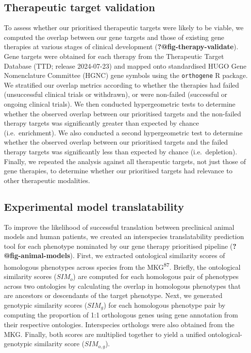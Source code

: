 \documentclass[
]{report}
\begin{document}
\subsection{Therapeutic target
validation}\label{therapeutic-target-validation-1}

To assess whether our prioritised therapeutic targets were likely to be
viable, we computed the overlap between our gene targets and those of
existing gene therapies at various stages of clinical development
(\textbf{?@fig-therapy-validate}). Gene targets were obtained for each
therapy from the Therapeutic Target Database (TTD; release 2024-07-23)
and mapped onto standardised HUGO Gene Nomenclature Committee (HGNC)
gene symbols using the \texttt{orthogene} R package. We stratified our
overlap metrics according to whether the therapies had failed
(unsuccessful clinical trials or withdrawn), or were non-failed
(successful or ongoing clinical trials). We then conducted
hypergeometric tests to determine whether the observed overlap between
our prioritised targets and the non-failed therapy targets was
significantly greater than expected by chance (i.e.~enrichment). We also
conducted a second hypergeometric test to determine whether the observed
overlap between our prioritised targets and the failed therapy targets
was significantly less than expected by chance (i.e.~depletion).
Finally, we repeated the analysis against all therapeutic targets, not
just those of gene therapies, to determine whether our prioritised
targets had relevance to other therapeutic modalities.

\subsection{Experimental model
translatability}\label{experimental-model-translatability-1}

To improve the likelihood of successful translation between preclinical
animal models and human patients, we created an interspecies
translatability prediction tool for each phenotype nominated by our gene
therapy prioritised pipeline (\textbf{?@fig-animal-models}). First, we
extracted ontological similarity scores of homologous phenotypes across
species from the MKG\textsuperscript{87}. Briefly, the ontological
similarity scores (\(SIM_o\)) are computed for each homologous pair of
phenotypes across two ontologies by calculating the overlap in
homologous phenotypes that are ancestors or descendants of the target
phenotype. Next, we generated genotypic similarity scores (\(SIM_g\))
for each homologous phenotype pair by computing the proportion of 1:1
orthologous genes using gene annotation from their respective
ontologies. Interspecies orthologs were also obtained from the MKG.
Finally, both scores are multiplied together to yield a unified
ontological-genotypic similarity score (\(SIM_{o,g}\)).
\end{document}
